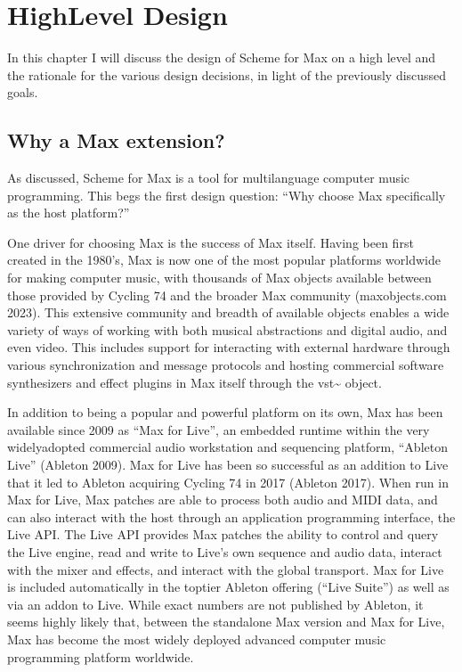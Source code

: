 \documentclass[letterpaper,10pt,english]{sphinxmanual}
\begin{document}
\sphinxstepscope


\chapter{High\sphinxhyphen{}Level Design}
\label{\detokenize{design:high-level-design}}\label{\detokenize{design::doc}}
\sphinxAtStartPar
In this chapter I will discuss the design of Scheme for Max on a high level
and the rationale for the various design decisions, in light of the previously discussed goals.


\section{Why a Max extension?}
\label{\detokenize{design:why-a-max-extension}}
\sphinxAtStartPar
As discussed, Scheme for Max is a tool for multi\sphinxhyphen{}language computer music programming. This begs
the first design question: “Why choose Max specifically as the host platform?”

\sphinxAtStartPar
One driver for choosing Max is the success of Max itself.
Having been first created in the 1980’s, Max is now one of the most popular platforms world\sphinxhyphen{}wide
for making computer music, with thousands of Max objects available between those provided by Cycling 74 and
the broader Max community (maxobjects.com 2023).
This extensive community and breadth of available objects enables a wide variety of ways of working
with both musical abstractions and digital audio, and even video.
This includes support for interacting with external hardware through various synchronization and
message protocols and hosting commercial software synthesizers and effect plugins in Max itself through
the vst\textasciitilde{} object.

\sphinxAtStartPar
In addition to being a popular and powerful platform on its own, Max has been available since 2009 as “Max for Live”,
an embedded runtime within the very widely\sphinxhyphen{}adopted commercial audio workstation and sequencing platform, “Ableton Live”
(Ableton 2009).
Max for Live has been so successful as an addition to Live that it led to Ableton acquiring Cycling 74 in 2017
(Ableton 2017).
When run in Max for Live, Max patches are able to process both audio
and MIDI data, and can also interact with the host through an application programming interface, the Live API.
The Live API provides Max patches the ability to control and query the Live engine, read and write to
Live’s own sequence and audio data, interact with the mixer and effects, and interact with the global transport.
Max for Live is included automatically in the top\sphinxhyphen{}tier Ableton offering (“Live Suite”) as well as via an add\sphinxhyphen{}on to Live.
While exact numbers are not published by Ableton, it seems highly likely that, between the standalone Max
version and Max for Live, Max has become the most widely deployed advanced computer music programming platform worldwide.
\end{document}
